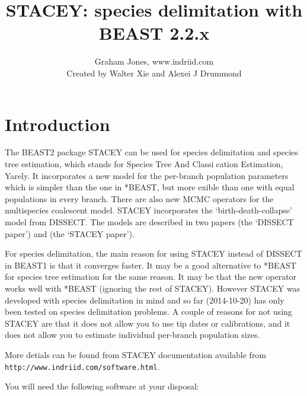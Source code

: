 \documentclass{article}
\newcommand{\BEASTVersion}{2.2.x}
\begin{document}
\title{STACEY: species delimitation with BEAST {\BEASTVersion}}

\author{Graham Jones, www.indriid.com\\
Created by Walter Xie and Alexei J Drummond}

\maketitle

\section{Introduction}

The BEAST2 package STACEY can be used for species delimitation and species tree estimation, which stands for Species Tree And Classication Estimation, Yarely. It incorporates a new model for the per-branch population parameters which is simpler than the one in *BEAST, but more exible than one with equal populations in every branch. There are also new MCMC operators for the multispecies coalescent model. STACEY incorporates the `birth-death-collapse' model from DISSECT. The models are described in two papers \cite{jones2014dissect} (the `DISSECT paper') and \cite{jones2014stacey} (the `STACEY paper').

For species delimitation, the main reason for using STACEY instead of DISSECT in BEAST1 is that it converges faster. It may be a good alternative to *BEAST for species tree estimation for the same reason. It may be that the new operator works well with *BEAST (ignoring the rest of STACEY). However STACEY was developed with species delimitation in mind and so far (2014-10-20) has only been tested on species delimitation problems. A couple of reasons for not using STACEY are that it does not allow you to use tip dates or calibrations, and it does not allow you to estimate individual per-branch population sizes.

More detials can be found from STACEY documentation available from \texttt{http://www.indriid.com/software.html}.

You will need the following software at your disposal:
\end{document}
